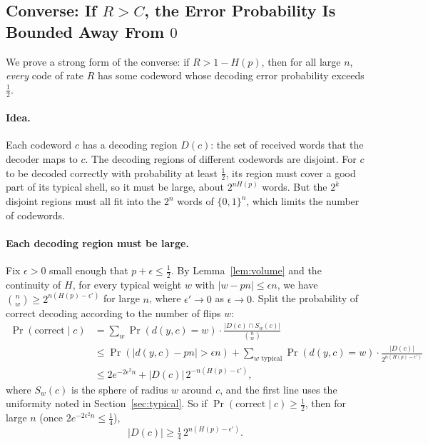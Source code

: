 \subsection{Converse: If \(R > C\), the Error Probability Is Bounded Away From \(0\)}
We prove a strong form of the converse: if \(R > 1-H(p)\), then for all large \(n\), \emph{every} code of rate \(R\) has some codeword whose decoding error probability exceeds \(\frac{1}{2}\).

\paragraph{Idea.} Each codeword \(c\) has a decoding region \(D(c)\): the set of received words that the decoder maps to \(c\). The decoding regions of different codewords are disjoint. For \(c\) to be decoded correctly with probability at least \(\frac{1}{2}\), its region must cover a good part of its typical shell, so it must be large, about \(2^{nH(p)}\) words. But the \(2^k\) disjoint regions must all fit into the \(2^n\) words of \(\{0,1\}^n\), which limits the number of codewords.

\paragraph{Each decoding region must be large.} Fix \(\epsilon > 0\) small enough that \(p + \epsilon \leq \frac{1}{2}\). By Lemma~\ref{lem:volume} and the continuity of \(H\), for every typical weight \(w\) with \(|w - pn| \leq \epsilon n\), we have \(\binom{n}{w} \geq 2^{n(H(p) - \epsilon')}\) for large \(n\), where \(\epsilon' \to 0\) as \(\epsilon \to 0\). Split the probability of correct decoding according to the number of flips \(w\):
\begin{align*}
\Pr(\text{correct} \mid c) &= \sum_{w} \Pr(d(y,c) = w) \cdot \frac{|D(c) \cap S_w(c)|}{\binom{n}{w}} \\
&\leq \Pr(|d(y,c) - pn| > \epsilon n) + \sum_{w \text{ typical}} \Pr(d(y,c) = w) \cdot \frac{|D(c)|}{2^{n(H(p) - \epsilon')}} \\
&\leq 2e^{-2\epsilon^2 n} + |D(c)|\, 2^{-n(H(p) - \epsilon')},
\end{align*}
where \(S_w(c)\) is the sphere of radius \(w\) around \(c\), and the first line uses the uniformity noted in Section~\ref{sec:typical}. So if \(\Pr(\text{correct} \mid c) \geq \frac{1}{2}\), then for large \(n\) (once \(2e^{-2\epsilon^2 n} \leq \frac{1}{4}\)),
\[|D(c)| \geq \tfrac{1}{4}\, 2^{n(H(p) - \epsilon')}.\]

